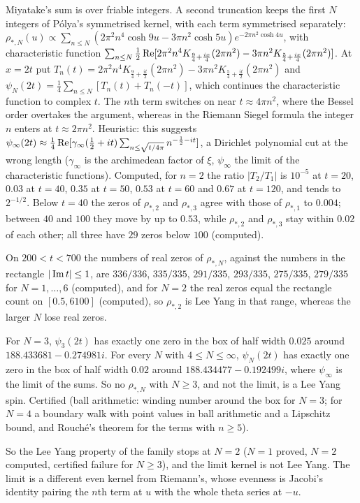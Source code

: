 \begin{remark}\label{mi:rem:starfamily}
Miyatake's sum is over friable integers. A second truncation keeps the first $N$ integers of P\'olya's symmetrised kernel, with each term symmetrised separately: $\rho_{*,N}(u)\propto\sum_{n\le N}(2\pi^2n^4\cosh9u-3\pi n^2\cosh5u)e^{-2\pi n^2\cosh4u}$, with characteristic function $\sum_{n\le N}\frac12\operatorname{Re}[2\pi^2n^4K_{\frac94+\frac{ix}4}(2\pi n^2)-3\pi n^2K_{\frac54+\frac{ix}4}(2\pi n^2)]$. At $x=2t$ put $T_n(t)=2\pi^2n^4K_{\frac94+\frac{it}2}(2\pi n^2)-3\pi n^2K_{\frac54+\frac{it}2}(2\pi n^2)$ and $\psi_N(2t)=\frac14\sum_{n\le N}[T_n(t)+T_n(-t)]$, which continues the characteristic function to complex $t$. The $n$th term switches on near $t\approx4\pi n^2$, where the Bessel order overtakes the argument, whereas in the Riemann Siegel formula the integer $n$ enters at $t\approx2\pi n^2$. Heuristic: this suggests $\psi_\infty(2t)\approx\frac14\operatorname{Re}[\gamma_\infty(\frac12+it)\sum_{n\le\sqrt{t/4\pi}}n^{-\frac12-it}]$, a Dirichlet polynomial cut at the wrong length ($\gamma_\infty$ is the archimedean factor of $\xi$, $\psi_\infty$ the limit of the characteristic functions). Computed, for $n=2$ the ratio $|T_2/T_1|$ is $10^{-5}$ at $t=20$, $0.03$ at $t=40$, $0.35$ at $t=50$, $0.53$ at $t=60$ and $0.67$ at $t=120$, and tends to $2^{-1/2}$. Below $t=40$ the zeros of $\rho_{*,2}$ and $\rho_{*,3}$ agree with those of $\rho_{*,1}$ to $0.004$; between $40$ and $100$ they move by up to $0.53$, while $\rho_{*,2}$ and $\rho_{*,3}$ stay within $0.02$ of each other; all three have $29$ zeros below $100$ (computed).

On $200<t<700$ the numbers of real zeros of $\rho_{*,N}$, against the numbers in the rectangle $|\operatorname{Im} t|\le1$, are $336/336$, $335/335$, $291/335$, $293/335$, $275/335$, $279/335$ for $N=1,\dots,6$ (computed), and for $N=2$ the real zeros equal the rectangle count on $[0.5,6100]$ (computed), so $\rho_{*,2}$ is Lee Yang in that range, whereas the larger $N$ lose real zeros.

\begin{proposition}\label{mi:prop:starnonreal}
For $N=3$, $\psi_3(2t)$ has exactly one zero in the box of half width $0.025$ around $188.433681-0.274981i$. For every $N$ with $4\le N\le\infty$, $\psi_N(2t)$ has exactly one zero in the box of half width $0.02$ around $188.434477-0.192499i$, where $\psi_\infty$ is the limit of the sums. So no $\rho_{*,N}$ with $N\ge3$, and not the limit, is a Lee Yang spin. Certified (ball arithmetic: winding number around the box for $N=3$; for $N=4$ a boundary walk with point values in ball arithmetic and a Lipschitz bound, and Rouch\'e's theorem for the terms with $n\ge5$).
\end{proposition}

So the Lee Yang property of the family stops at $N=2$ ($N=1$ proved, $N=2$ computed, certified failure for $N\ge3$), and the limit kernel is not Lee Yang. The limit is a different even kernel from Riemann's, whose evenness is Jacobi's identity pairing the $n$th term at $u$ with the whole theta series at $-u$.
\end{remark}

